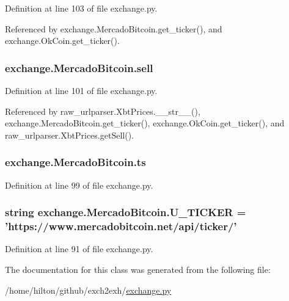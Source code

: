 Definition at line 103 of file exchange.\-py.



Referenced by exchange.\-Mercado\-Bitcoin.\-get\-\_\-ticker(), and exchange.\-Ok\-Coin.\-get\-\_\-ticker().

\hypertarget{classexchange_1_1_mercado_bitcoin_a9982c7a3f6103c88c64160a5854c35cd}{
\subsubsection[{sell}]{\setlength{\rightskip}{0pt plus 5cm}exchange.\-Mercado\-Bitcoin.\-sell}}\label{classexchange_1_1_mercado_bitcoin_a9982c7a3f6103c88c64160a5854c35cd}


Definition at line 101 of file exchange.\-py.



Referenced by raw\-\_\-urlparser.\-Xbt\-Prices.\-\_\-\-\_\-str\-\_\-\-\_\-(), exchange.\-Mercado\-Bitcoin.\-get\-\_\-ticker(), exchange.\-Ok\-Coin.\-get\-\_\-ticker(), and raw\-\_\-urlparser.\-Xbt\-Prices.\-get\-Sell().

\hypertarget{classexchange_1_1_mercado_bitcoin_ac4630b08e08f9eeb9dad838dc9dc0cda}{
\subsubsection[{ts}]{\setlength{\rightskip}{0pt plus 5cm}exchange.\-Mercado\-Bitcoin.\-ts}}\label{classexchange_1_1_mercado_bitcoin_ac4630b08e08f9eeb9dad838dc9dc0cda}


Definition at line 99 of file exchange.\-py.

\hypertarget{classexchange_1_1_mercado_bitcoin_a310b7df5ae9e8a46bad918428c67d4e8}{
\subsubsection[{U\-\_\-\-T\-I\-C\-K\-E\-R}]{\setlength{\rightskip}{0pt plus 5cm}string exchange.\-Mercado\-Bitcoin.\-U\-\_\-\-T\-I\-C\-K\-E\-R = 'https\-://www.\-mercadobitcoin.\-net/api/ticker/'\hspace{0.3cm}{\ttfamily [static]}}}\label{classexchange_1_1_mercado_bitcoin_a310b7df5ae9e8a46bad918428c67d4e8}


Definition at line 91 of file exchange.\-py.



The documentation for this class was generated from the following file\-:\begin{DoxyCompactItemize}
\item 
/home/hilton/github/exch2exh/\hyperlink{exchange_8py}{exchange.\-py}\end{DoxyCompactItemize}
